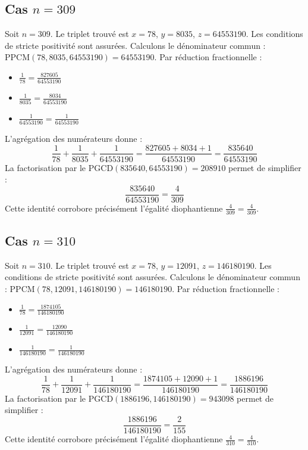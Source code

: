 \documentclass[11pt,a4paper]{article}
\begin{document}
\subsection{Cas $n = 309$}
Soit $n = 309$. Le triplet trouvé est $x = 78$, $y = 8035$, $z = 64553190$.
Les conditions de stricte positivité sont assurées.
Calculons le dénominateur commun : $\text{PPCM}(78, 8035, 64553190) = 64553190$.
Par réduction fractionnelle :
\begin{itemize}
    \item $\frac{1}{78} = \frac{827605}{64553190}$
    \item $\frac{1}{8035} = \frac{8034}{64553190}$
    \item $\frac{1}{64553190} = \frac{1}{64553190}$
\end{itemize}
L'agrégation des numérateurs donne :
$$ \frac{1}{78} + \frac{1}{8035} + \frac{1}{64553190} = \frac{827605 + 8034 + 1}{64553190} = \frac{835640}{64553190} $$
La factorisation par le $\text{PGCD}(835640, 64553190) = 208910$ permet de simplifier :
$$ \frac{835640}{64553190} = \frac{4}{309} $$
Cette identité corrobore précisément l'égalité diophantienne $\frac{4}{309} = \frac{4}{309}$.

\subsection{Cas $n = 310$}
Soit $n = 310$. Le triplet trouvé est $x = 78$, $y = 12091$, $z = 146180190$.
Les conditions de stricte positivité sont assurées.
Calculons le dénominateur commun : $\text{PPCM}(78, 12091, 146180190) = 146180190$.
Par réduction fractionnelle :
\begin{itemize}
    \item $\frac{1}{78} = \frac{1874105}{146180190}$
    \item $\frac{1}{12091} = \frac{12090}{146180190}$
    \item $\frac{1}{146180190} = \frac{1}{146180190}$
\end{itemize}
L'agrégation des numérateurs donne :
$$ \frac{1}{78} + \frac{1}{12091} + \frac{1}{146180190} = \frac{1874105 + 12090 + 1}{146180190} = \frac{1886196}{146180190} $$
La factorisation par le $\text{PGCD}(1886196, 146180190) = 943098$ permet de simplifier :
$$ \frac{1886196}{146180190} = \frac{2}{155} $$
Cette identité corrobore précisément l'égalité diophantienne $\frac{4}{310} = \frac{4}{310}$.
\end{document}
